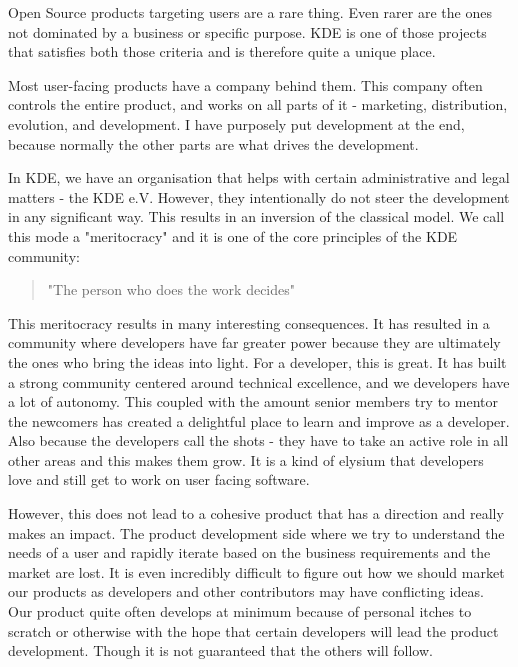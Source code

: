 

\noindent{}Open Source products targeting users are a rare thing. Even rarer are the ones not dominated by a business or specific purpose. KDE is one of those projects that satisfies both those criteria and is therefore quite a unique place.

Most user-facing products have a company behind them. This company often controls the entire product, and works on all parts of it - marketing, distribution, evolution, and development. I have purposely put development at the end, because normally the other parts are what drives the development.

In KDE, we have an organisation that helps with certain administrative and legal matters - the KDE e.V. However, they intentionally do not steer the development in any significant way. This results in an inversion of the classical model. We call this mode a "meritocracy" and it is one of the core principles of the KDE community:

\begin{quote}"The person who does the work decides"\end{quote}

This meritocracy results in many interesting consequences. It has resulted in a community where developers have far greater power because they are ultimately the ones who bring the ideas into light. For a developer, this is great. It has built a strong community centered around technical excellence, and we developers have a lot of autonomy. This coupled with the amount senior members try to mentor the newcomers has created a delightful place to learn and improve as a developer. Also because the developers call the shots - they have to take an active role in all other areas and this makes them grow. It is a kind of elysium that developers love and still get to work on user facing software.

However, this does not lead to a cohesive product that has a direction and really makes an impact. The product development side where we try to understand the needs of a user and rapidly iterate based on the business requirements and the market are lost. It is even incredibly difficult to figure out how we should market our products as developers and other contributors may have conflicting ideas. Our product quite often develops at minimum because of personal itches to scratch or otherwise with the hope that certain developers will lead the product development. Though it is not guaranteed that the others will follow.

